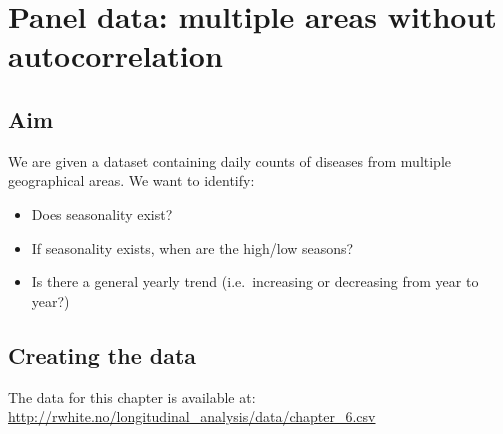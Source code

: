 \documentclass[]{book}
\providecommand{\tightlist}{%
  \setlength{\itemsep}{0pt}\setlength{\parskip}{0pt}}
\begin{document}
\chapter{Panel data: multiple areas without
autocorrelation}\label{panel-data-multiple-areas-without-autocorrelation}

\section{Aim}\label{aim-3}

We are given a dataset containing daily counts of diseases from multiple
geographical areas. We want to identify:

\begin{itemize}
\tightlist
\item
  Does seasonality exist?
\item
  If seasonality exists, when are the high/low seasons?
\item
  Is there a general yearly trend (i.e.~increasing or decreasing from
  year to year?)
\end{itemize}

\newpage

\section{Creating the data}\label{creating-the-data-3}

The data for this chapter is available at:
\url{http://rwhite.no/longitudinal_analysis/data/chapter_6.csv}
\end{document}
